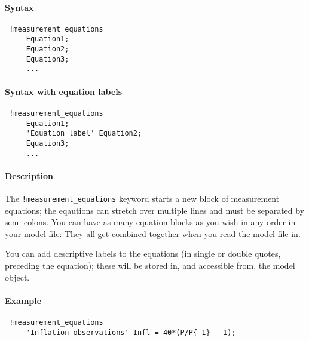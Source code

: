 


	\paragraph{Syntax}
 
 \begin{verbatim}
 !measurement_equations
     Equation1;
     Equation2;
     Equation3;
     ...
 \end{verbatim}
 
 \paragraph{Syntax with equation labels}
 
 \begin{verbatim}
 !measurement_equations
     Equation1;
     'Equation label' Equation2;
     Equation3;
     ...
 \end{verbatim}
 
 \paragraph{Description}
 
 The \texttt{!measurement\_equations} keyword starts a new block of
 measurement equations; the eqautions can stretch over multiple lines and
 must be separated by semi-colons. You can have as many equation blocks
 as you wish in any order in your model file: They all get combined
 together when you read the model file in.
 
 You can add descriptive labels to the equations (in single or double
 quotes, preceding the equation); these will be stored in, and accessible
 from, the model object.
 
 \paragraph{Example}
 
 \begin{verbatim}
 !measurement_equations
     'Inflation observations' Infl = 40*(P/P{-1} - 1);
 \end{verbatim}


